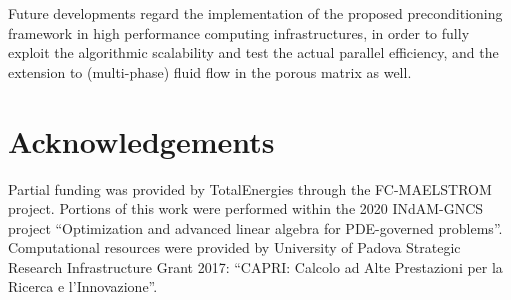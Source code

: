 \documentclass[3p,times]{elsarticle}
\theoremstyle{plain}
\begin{document}
Future developments regard the implementation of the proposed preconditioning framework in high performance computing
infrastructures, in order to fully exploit the algorithmic scalability and test the actual parallel efficiency, and the extension to (multi-phase) fluid flow in the porous matrix as well.




\section*{Acknowledgements}
\label{sec::acknow}
Partial funding was provided by TotalEnergies through the FC-MAELSTROM project.
%
Portions of this work were performed 
within the 2020 INdAM-GNCS project ``Optimization and advanced linear algebra for PDE-governed problems''.
%
Computational resources were provided by University of Padova Strategic Research
Infrastructure Grant 2017: ``CAPRI: Calcolo ad Alte Prestazioni per la Ricerca e
l’Innovazione''.


%


\end{document}
